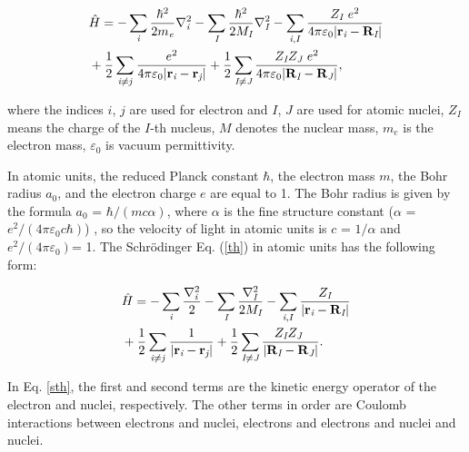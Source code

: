 \documentclass[a4paper, 12pt, titlepage,oneside,drop]{kthesis}
\begin{document}
\begin{equation}\label{th}
\begin{split}
& \hath = - \sumi<i> {\frac{\hbar^{2}}{2 m_{\textit e}}}   \nablaia<i> - \sumi<I> {\frac{\hbar^{2}}{2 M_\textit{I}}} \nablaia<I>  - \sumij<i><I> \frac{Z_\textit{I}\ e^2}{4 \pi \varepsilon_0 |\textbf{r}_\textit{i}-\textbf{R}_\textit{I}|} \\
& + \frac{1}{2} \suminj<i><j> \frac{ e^2}{4 \pi \varepsilon_0 |\textbf{r}_\textit{i}-\textbf{r}_\textit{j}|} + \frac{1}{2} \suminj<I><J> \frac{Z_\textit{I} Z_\textit{J}\  e^2}{4 \pi \varepsilon_0 |\textbf{R}_\textit{I}-\textbf{R}_\textit{J}|},
\end{split}
\end{equation}

where the indices $\textit{i}$, $\textit{j}$ are used for electron and $\textit{I}$, $\textit{J}$ are used for atomic nuclei, $Z_\textit{I}$ means the charge of the $\textit{I}$-th nucleus,
$\textit{M}$ denotes the nuclear mass, $m_e$ is the electron mass, $\varepsilon_0$ is vacuum permittivity.

In atomic units, the reduced Planck constant $\hbar$, the electron mass $m$, the Bohr radius $a_0$, and the electron charge
$e$ are equal to 1. The Bohr radius is given by the formula $a_0$ = ${\hbar} / {(mc\alpha)}$, where $\alpha$ is the fine structure
constant ($\alpha$ = ${e^2}/{(4 \pi \varepsilon_0 c \hbar)}$) , so the velocity of light in atomic units is $c$ = $1/{\alpha}$ and ${e^2}/{(4 \pi \varepsilon_0)}$= 1. The Schrödinger Eq. (\ref{th}) in atomic units has 
the following form:

\begin{equation}\label{sth}\begin{split}
&\hath = - \sumi<i>   \frac{{{\nabla}_{\textit{i}}^{2}}}{2} - \sumi<I> \frac{{{\nabla}_{\textit{I}}^{2}}}{2 M_\textit{I}}  - \sumij<i><I> \frac{Z_\textit{I}}{|\textbf{r}_\textit{i}-\textbf{R}_\textit{I}|} \\
& + \frac{1}{2} \suminj<i><j> \frac{1}{ |\textbf{r}_\textit{i}-\textbf{r}_\textit{j}|} + \frac{1}{2} \suminj<I><J> \frac{Z_\textit{I} Z_\textit{J}\ }{|\textbf{R}_\textit{I}-\textbf{R}_\textit{J}|}.
\end{split}\end{equation}

In Eq. \ref{sth}, the first and second terms are the kinetic energy operator of the electron and nuclei, respectively.
The other terms in order are Coulomb interactions between electrons and nuclei, electrons and electrons and nuclei and nuclei.
\end{document}
